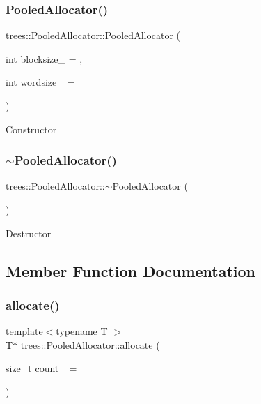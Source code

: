 \subsubsection{\texorpdfstring{Pooled\+Allocator()}{PooledAllocator()}}
{\footnotesize\ttfamily trees\+::\+Pooled\+Allocator\+::\+Pooled\+Allocator (\begin{DoxyParamCaption}\item[{int}]{blocksize\+\_\+ = {},  }\item[{int}]{wordsize\+\_\+ = {} }\end{DoxyParamCaption})\hspace{0.3cm}{\ttfamily [inline]}}

Constructor \mbox{\label{classtrees_1_1_pooled_allocator_a02a16650ef941629896065e047542c9b}} 
\subsubsection{\texorpdfstring{$\sim$\+Pooled\+Allocator()}{~PooledAllocator()}}
{\footnotesize\ttfamily trees\+::\+Pooled\+Allocator\+::$\sim$\+Pooled\+Allocator (\begin{DoxyParamCaption}{ }\end{DoxyParamCaption})\hspace{0.3cm}{\ttfamily [inline]}}

Destructor 

\subsection{Member Function Documentation}
\mbox{\label{classtrees_1_1_pooled_allocator_af5bd259585b270d0c43a48c147835699}} 
\subsubsection{\texorpdfstring{allocate()}{allocate()}}
{\footnotesize\ttfamily template$<$typename T $>$ \\
T$\ast$ trees\+::\+Pooled\+Allocator\+::allocate (\begin{DoxyParamCaption}\item[{size\+\_\+t}]{count\+\_\+ = {} }\end{DoxyParamCaption})\hspace{0.3cm}{\ttfamily [inline]}}

